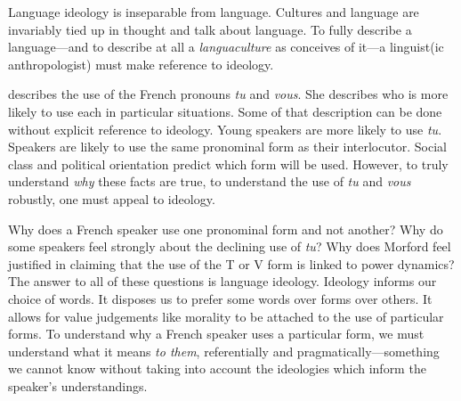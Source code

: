 \documentclass[man,12pt,natbib]{apa6}
\begin{document}
\begin{quote}
\end{quote}
\clearpage

Language ideology is inseparable from language. Cultures and language are
invariably tied up in thought and talk about language. To fully describe a
language---and to describe at all a \emph{languaculture} as \citet{Agar95}
conceives of it---a linguist(ic anthropologist) must make reference to
ideology.

\citet{Morford97} describes the use of the French pronouns \emph{tu} and
\emph{vous}. She describes who is more likely to use each in particular
situations. Some of that description can be done without explicit reference to
ideology. Young speakers are more likely to use \emph{tu}. Speakers are likely
to use the same pronominal form as their interlocutor. Social class and
political orientation predict which form will be used. However, to truly
understand \emph{why} these facts are true, to understand the use of \emph{tu}
and \emph{vous} robustly, one must appeal to ideology.

Why does a French speaker use one pronominal form and not another? Why do some
speakers feel strongly about the declining use of \emph{tu}? Why does Morford
feel justified in claiming that the use of the T or V form is linked to power
dynamics? The answer to all of these questions is language ideology. Ideology
informs our choice of words. It disposes us to prefer some words over forms
over others. It allows for value judgements like morality to be attached to the
use of particular forms. To understand why a French speaker uses a particular
form, we must understand what it means \emph{to them}, referentially and 
pragmatically---something we cannot know without taking into account the 
ideologies which inform the speaker's understandings.
\end{document}
